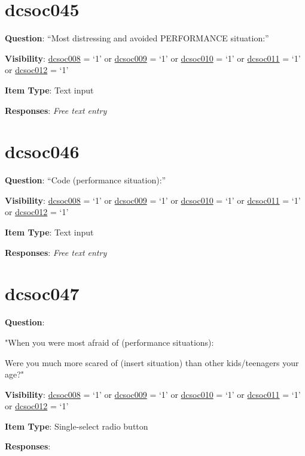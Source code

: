 \documentclass[]{book}
\begin{document}
\hypertarget{dcsoc045}{%
\section{dcsoc045}\label{dcsoc045}}

\textbf{Question}: ``Most distressing and avoided PERFORMANCE situation:''

\textbf{Visibility}: \protect\hyperlink{dcsoc008}{dcsoc008} = `1' or \protect\hyperlink{dcsoc009}{dcsoc009} = `1' or \protect\hyperlink{dcsoc010}{dcsoc010} = `1' or \protect\hyperlink{dcsoc011}{dcsoc011} = `1' or \protect\hyperlink{dcsoc012}{dcsoc012} = `1'

\textbf{Item Type}: Text input

\textbf{Responses}: \emph{Free text entry}

\hypertarget{dcsoc046}{%
\section{dcsoc046}\label{dcsoc046}}

\textbf{Question}: ``Code (performance situation):''

\textbf{Visibility}: \protect\hyperlink{dcsoc008}{dcsoc008} = `1' or \protect\hyperlink{dcsoc009}{dcsoc009} = `1' or \protect\hyperlink{dcsoc010}{dcsoc010} = `1' or \protect\hyperlink{dcsoc011}{dcsoc011} = `1' or \protect\hyperlink{dcsoc012}{dcsoc012} = `1'

\textbf{Item Type}: Text input

\textbf{Responses}: \emph{Free text entry}

\hypertarget{dcsoc047}{%
\section{dcsoc047}\label{dcsoc047}}

\textbf{Question}:

"When you were most afraid of (performance situations):

Were you much more scared of (insert situation) than other kids/teenagers your age?"

\textbf{Visibility}: \protect\hyperlink{dcsoc008}{dcsoc008} = `1' or \protect\hyperlink{dcsoc009}{dcsoc009} = `1' or \protect\hyperlink{dcsoc010}{dcsoc010} = `1' or \protect\hyperlink{dcsoc011}{dcsoc011} = `1' or \protect\hyperlink{dcsoc012}{dcsoc012} = `1'

\textbf{Item Type}: Single-select radio button

\textbf{Responses}:
\end{document}
